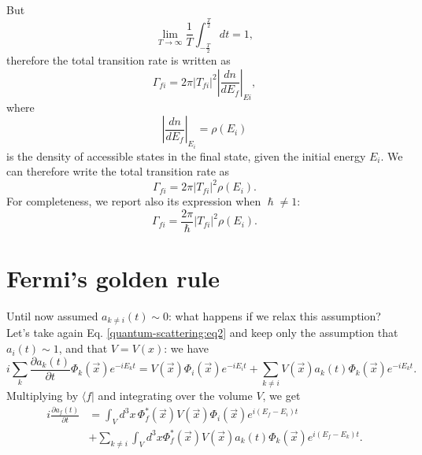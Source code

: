 But
\begin{equation*}
    \lim_{T\rightarrow \infty} \frac{1}{T}\int_{-\frac{T}{2}}^{\frac{T}{2}}dt = 1,
\end{equation*}
therefore the total transition rate is written as
\begin{equation*}
    \Gamma_{fi} = 2\pi|T_{fi}|^2\left|\frac{dn}{dE_{f}}\right|_{Ei},
\end{equation*}
where
\begin{equation*}
      \left|\frac{dn}{dE_f} \right|_{E_{i}} = \rho(E_i)
\end{equation*}
is the density of accessible states in the final state, given the initial energy $E_{i}$. We can therefore write the total transition rate as
\begin{equation*}
    \Gamma_{fi} = 2\pi|T_{fi}|^2\rho(E_{i}).
\end{equation*}
For completeness, we report also its expression when $\hslash\neq1$:
\begin{equation*}
    \Gamma_{fi} = \frac{2\pi}{\hslash}|T_{fi}|^2\rho(E_{i}).
\end{equation*}

\section{Fermi's golden rule}
Until now assumed $a_{k\neq i} (t) \sim 0$: what happens if we relax this assumption? Let's take again Eq. \eqref{quantum-scattering:eq2} and keep only the assumption that $a_{i}(t) \sim 1$, and that $V=V(x)$: we have
\begin{equation*}
    i \sum_{k} \frac{\partial a_{k}(t)}{\partial t} \Phi_{k}(\Vec{x})e^{-iE_{k}t} = V(\Vec{x})\Phi_{i}(\Vec{x})e^{-iE_{i}t} + \sum_{k\neq i}  V(\Vec{x})a_{k}(t)\Phi_{k}(\Vec{x})e^{-iE_{k}t}.
\end{equation*}
Multiplying by $\langle f |$ and integrating over the volume $V$, we get
\begin{equation}
\begin{split}
    i\frac{\partial a_{f}(t)}{\partial t} &= \int_{V}d^3x\,\Phi_{f}^*(\Vec{x})V(\Vec{x})\Phi_{i}(\Vec{x})e^{i(E_{f}-E_{i})t} \\&+ \sum_{k\neq i}\int_V d^3x\Phi_f^*(\Vec{x})V(\Vec{x})a_{k}(t)\Phi_{k}(\Vec{x}) e^{i(E_{f}-E_{k})t}.
\end{split}
    \label{quantum-scattering:eq4}
\end{equation}

